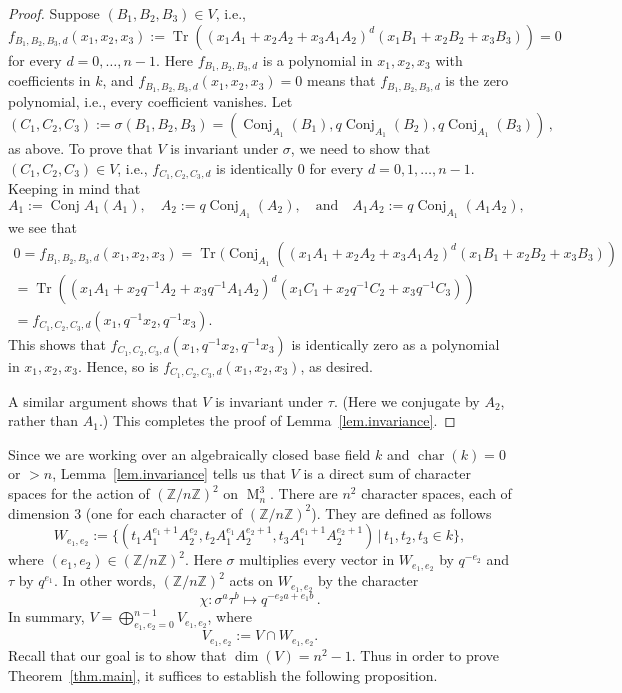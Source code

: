 \documentclass[12pt]{amsart}
\numberwithin{equation}{section}
\numberwithin{subsection}{section}
\theoremstyle{definition} \newtheorem{definition}[theorem]{Definition}
\newcommand\Conj{\operatorname{Conj}}
\newcommand\Char{\operatorname{char}}
\newcommand\bbZ{\mathbb{Z}}
\newcommand{\tr}{\operatorname{Tr}}
\newcommand{\Mat}{\operatorname{M}}
\begin{document}
\begin{proof} Suppose $(B_1, B_2, B_3) \in V$, i.e., 
\[ f_{B_1, B_2, B_3, d}(x_1, x_2, x_3) := 
\tr((x_1 A_1 + x_2 A_2 + x_3 A_1 A_2)^d
(x_1 B_1 + x_2 B_2 + x_3 B_3)) = 0 \]
for every $d = 0, \dots, n-1$. Here $f_{B_1, B_2, B_3, d}$ 
is a polynomial in $x_1, x_2, x_3$ with coefficients in $k$,
and $f_{B_1, B_2, B_3, d}(x_1, x_2, x_3) = 0$ means 
that $f_{B_1, B_2, B_3, d}$ is the zero polynomial, i.e., 
every coefficient vanishes.  Let 
\[ (C_1, C_2, C_3) := \sigma(B_1, B_2, B_3) =
(\Conj_{A_1}( B_1)  , q \Conj_{A_1} (B_2), q \Conj_{A_1}(B_3)) \, ,\]
as above.  To prove that $V$ is invariant
under $\sigma$, we need to show that $(C_1, C_2, C_3) \in V$, i.e., 
$f_{C_1, C_2, C_3, d}$
is identically $0$ for every $d= 0, 1, \dots, n-1$.
Keeping in mind that 
\[ A_1 := \Conj{A_1} (A_1), \quad 
A_2 := q \Conj_{A_1} (A_2), \quad \text{and} \quad 
A_1 A_2 := q \Conj_{A_1}(A_1 A_2), \]
we see that
\begin{gather}
\nonumber
0 = f_{B_1, B_2, B_3, d}(x_1, x_2, x_3)  
=   \tr( \Conj_{A_1} ((x_1 A_1 + x_2 A_2 + x_3 A_1 A_2)^d
(x_1 B_1 + x_2 B_2 + x_3 B_3)) \\
\nonumber
 = \tr((x_1 A_1 + x_2 q^{-1} A_2 + x_3 q^{-1} A_1 A_2)^d
  (x_1 C_1 +  x_2 q^{-1} C_2 + 
x_3 q^{-1} C_3)) \\ 
\nonumber
= f_{C_1, C_2, C_3, d}(x_1, q^{-1} x_2, q^{-1} x_3).  
\end{gather}
This shows that 
$f_{C_1, C_2, C_3, d}(x_1, q^{-1} x_2, q^{-1} x_3)$ is identically zero
as a polynomial in $x_1, x_2, x_3$.  Hence, so is   
$f_{C_1, C_2, C_3, d}(x_1, x_2, x_3)$, as desired.

A similar argument shows that $V$ is invariant under $\tau$. (Here 
we conjugate by $A_2$, rather than $A_1$.)
This completes the proof of Lemma~\ref{lem.invariance}.
\end{proof}
  
Since we are working over an algebraically closed base field $k$ 
and $\Char(k) = 0$ or $> n$,
Lemma~\ref{lem.invariance} tells us that $V$ is a direct sum of 
character spaces for the action of 
$(\bbZ/ n \bbZ)^2$ on $\Mat_n^3$.
There are $n^2$ character spaces, each of dimension $3$
(one for each character of $(\bbZ/ n \bbZ)^2$). They are defined as follows
\[ W_{e_1, e_2} := \{ (t_1 A_1^{e_1 + 1} A_2^{e_2}, 
t_2 A_1^{e_1} A_2^{e_2 + 1}, t_3 A_1^{e_1 + 1} A_2^{e_2 + 1}) \, | \,
t_1, t_2, t_3 \in k \} , \]
where $(e_1, e_2) \in (\bbZ/n \bbZ)^2$. Here $\sigma$ multiplies
every vector in $W_{e_1, e_2}$ by $q^{-e_2}$ and $\tau$ by $q^{e_1}$.
In other words, $(\bbZ/n \bbZ)^2$ acts on $W_{e_1, e_2}$
by the character
\[ \chi \colon \sigma^a \tau^b \mapsto q^{-e_2 a + e_1 b} \, . \]
In summary, 
$V = \bigoplus_{e_1, e_2  = 0}^{n-1} V_{e_1, e_2}$, 
where \[ V_{e_1, e_2} := V \cap W_{e_1, e_2}. \] 
Recall that our goal is to show that $\dim(V) = n^2 - 1$. 
Thus in order to prove Theorem~\ref{thm.main}, it suffices 
to establish
the following proposition. 
\end{document}
